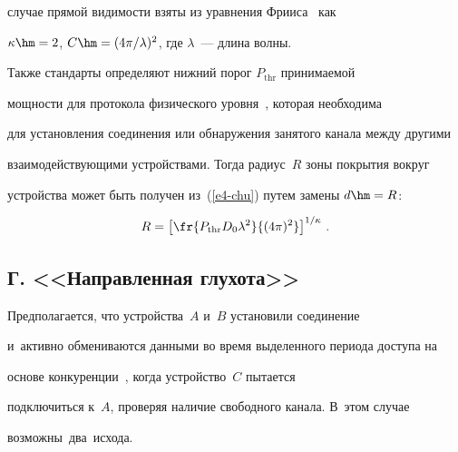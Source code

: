 случае прямой видимости взяты из уравнения Фрииса~\cite{8-chu} как 


$\kappa\hm=2$, $C\hm= (4\pi/\lambda)^2$, где $\lambda$~--- длина волны.





  Также стандарты определяют нижний порог $P_{\mathrm{thr}}$ принимаемой 


мощности для протокола физического уровня~\cite{7-chu}, которая необходима 


для установления соединения или обнаружения занятого канала между другими 


взаимодействующими устройствами. Тогда радиус~$R$ зоны покрытия вокруг 


устройства может быть получен из~(\ref{e4-chu}) путем замены $d\hm=R$:


  \begin{equation*}


  R=\left[ \fr{P_{\mathrm{thr}} D_0\lambda^2}{(4\pi)^2}\right]^{1/\kappa}\,.




  \end{equation*}


  


  \subsection*{Г. <<Направленная глухота>>}


  


  Предполагается, что устройства~$A$ и~$B$ установили соединение 


и~активно обмениваются данными во время выделенного периода доступа на 


основе конкуренции~\cite{7-chu}, когда устройство~$C$ пытается 


подключиться к~$A$, проверяя наличие свободного канала. В~этом случае 


возможны~два~исхода.


